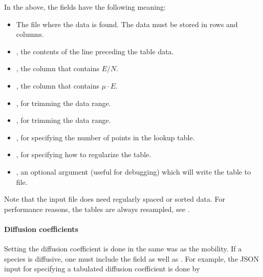 \documentclass[letterpaper,10pt,english]{sphinxmanual}
\begin{document}
In the above, the fields have the following meaning:
\begin{itemize}
\item {} 
 The file where the data is found.
The data must be stored in rows and columns.

\item {} 
, the contents of the line preceding the table data.

\item {} 
, the column that contains \(E/N\).

\item {} 
, the column that contains \(\mu\cdot E\).

\item {} 
, for trimming the data range.

\item {} 
, for trimming the data range.

\item {} 
, for specifying the number of points in the lookup table.

\item {} 
, for specifying how to regularize the table.

\item {} 
, an optional argument (useful for debugging) which will write the table to file.

\end{itemize}

Note that the input file does  need regularly spaced or sorted data.
For performance reasons, the tables are always resampled, see {\hyperref[\detokenize{Utilities/LookupTable:chap-lookuptable}]{}}.


\paragraph{Diffusion coefficients}
\label{\detokenize{Applications/CdrPlasmaModel:diffusion-coefficients}}
Setting the diffusion coefficient is done  in the same was as the mobility.
If a species is diffusive, one must include the field  as well as .
For example, the JSON input for specifying a tabulated diffusion coefficient is done by
\end{document}
